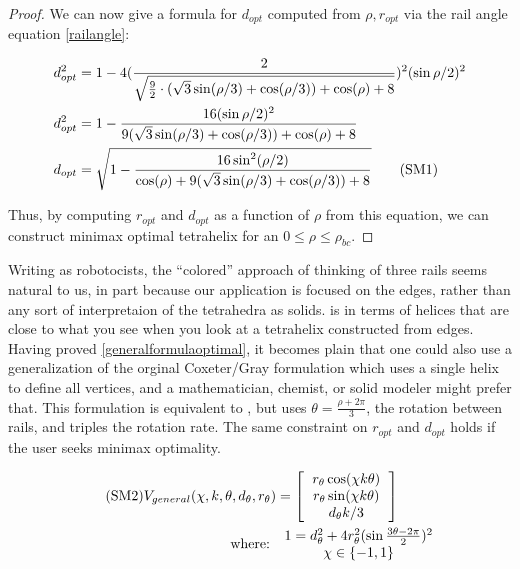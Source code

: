 \documentclass[review]{siamonline1116}
\newcommand\numberthis{\addtocounter{equation}{1}\tag{\theequation}}
\begin{document}
\begin{proof}
We can now give a formula for $ d_{opt} $ computed from $\rho, r_{opt}$ via the rail angle equation \eqref{railangle}:

\begin{align*}
  d_{opt}^2 &= 1 - 4 (\frac{2}{\sqrt{\frac{9}{2} \cdot ( \sqrt{3} \sin(\rho/3) + \cos(\rho/3)) + \cos(\rho)+ 8 }})^2 (\sin{ \rho / 2})^2   \\
  d_{opt}^2 &= 1 - \frac{16(\sin{ \rho / 2})^2}{9 ( \sqrt{3} \sin(\rho/3) + \cos(\rho/3)) + \cos(\rho)+ 8 }    \\
    d_{opt} &= \sqrt{1 - \frac{16 \sin^2(\rho / 2) }{ \cos(\rho) + 9( \sqrt{3} \sin(\rho/3) + \cos(\rho/3)) + 8 }}    \numberthis  \label{dopt}  \\      
\end{align*}

Thus, by computing $r_{opt}$  and $d_{opt}$ as a function of $\rho$ from this equation, we can construct minimax optimal tetrahelix for an $0 \leq \rho \leq \rho_{bc}$.
\end{proof}

Writing as robotocists, the ``colored'' approach of thinking of three rails seems natural to us, in part because our application
is focused on the edges, rather than any sort of interpretaion of the tetrahedra as solids.  is in terms of helices that are close
to what you see when you look at a tetrahelix constructed from edges.
Having proved \cref{generalformulaoptimal}, it becomes plain that one could also use
 a generalization of the orginal Coxeter/Gray formulation which uses a single helix to define all vertices, and a mathematician, chemist,
or solid modeler might prefer that. This formulation is equivalent to , but uses $\theta = \frac{\rho+ 2\pi}{3}$,
the rotation between rails, and triples the rotation rate. The same constraint on $r_{opt}$ and $d_{opt}$ holds if the user seeks minimax optimality.

\begin{align*}
\numberthis  \label{eq:coxetergraygeneral}  
V_{general}(\chi,k,\theta,d_{\theta},r_{\theta}) &= 
 \left [
  \begin{tabular}{c}
   $ r_{\theta} \cos(\chi k \theta) $\\
   $ r_{\theta}  \sin(\chi k \theta) $\\
   $ d_{\theta} k / 3 $
  \end{tabular}
  \right ] \\
\text{where: } &
\begin{tabular}{c}
  $   1 = d_{\theta}^2 + 4 r_{\theta}^2 (\sin{ \frac{3\theta - 2\pi}{2}})^2 $ \\
    $\chi \in \{-1,1\}$ \\  
\end{tabular}
\end{align*}
\end{document}
